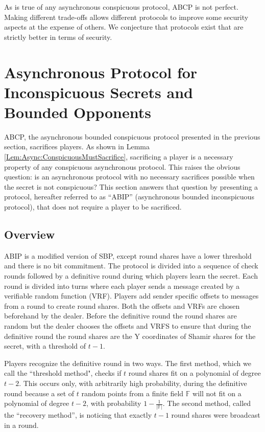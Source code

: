 \documentclass{dalcsthesis}
\begin{document}
As is true of any asynchronous conspicuous protocol, ABCP is not perfect. Making different trade-offs allows different protocols to improve some security aspects at the expense of others. We conjecture that protocols exist that are strictly better in terms of security.



\section{Asynchronous Protocol for Inconspicuous Secrets and Bounded Opponents}

ABCP, the asynchronous bounded conspicuous protocol presented in the previous section, sacrifices players. As shown in Lemma \ref{Lem:Async:ConspicuousMustSacrifice}, sacrificing a player is a necessary property of any conspicuous asynchronous protocol. This raises the obvious question: is an asynchronous protocol with no necessary sacrifices possible when the secret is not conspicuous? This section answers that question by presenting a protocol, hereafter referred to as ``ABIP'' (asynchronous bounded inconspicuous protocol), that does not require a player to be sacrificed.


\subsection{Overview}

ABIP is a modified version of SBP, except round shares have a lower threshold and there is no bit commitment. The protocol is divided into a sequence of check rounds followed by a definitive round during which players learn the secret. Each round is divided into turns where each player sends a message created by a verifiable random function (VRF). Players add sender specific offsets to messages from a round to create round shares. Both the offsets and VRFs are chosen beforehand by the dealer. Before the definitive round the round shares are random but the dealer chooses the offsets and VRFS to ensure that during the definitive round the round shares are the Y coordinates of Shamir shares for the secret, with a threshold of $t-1$.

Players recognize the definitive round in two ways. The first method, which we call the ``threshold method", checks if $t$ round shares fit on a polynomial of degree $t-2$. This occurs only, with arbitrarily high probability, during the definitive round because a set of $t$ random points from a finite field $\mathbb{F}$ will not fit on a polynomial of degree $t-2$, with probability $1 - \frac{1}{|\mathbb{F}|}$. The second method, called the ``recovery method'', is noticing that exactly $t-1$ round shares were broadcast in a round.
\end{document}
